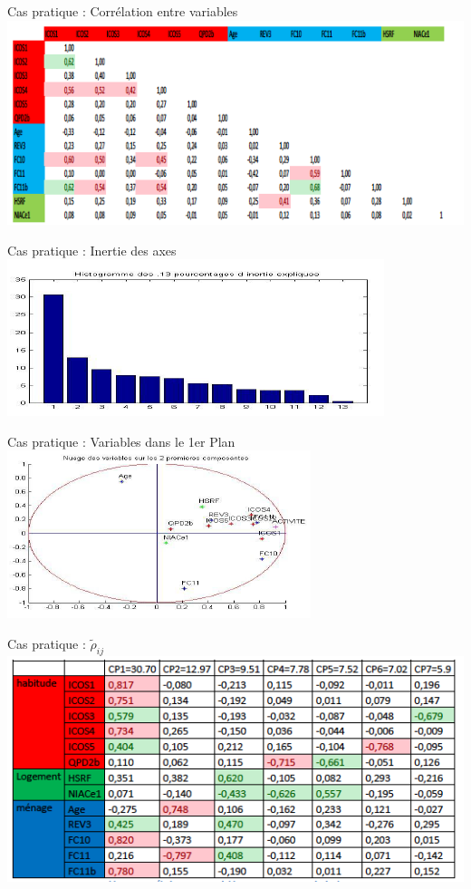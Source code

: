 \documentclass[10pt]{beamer}
\begin{document}
\begin{frame}{ Cas pratique : Corrélation entre variables }
\centering 
\includegraphics[scale=0.5]{CNL2} 

\end{frame}

\begin{frame}{ Cas pratique : Inertie des axes}
\centering 
\includegraphics[scale=0.7]{CNL3} 

\end{frame}


\begin{frame}{ Cas pratique : Variables dans le 1er Plan  }
\centering 
\includegraphics[scale=0.7]{CNL4} 

\end{frame}

\begin{frame}{ Cas pratique :  $\tilde{\rho}_{ij}$}
\centering 
\includegraphics[scale=0.6]{CNL5} 

\end{frame}
\end{document}
